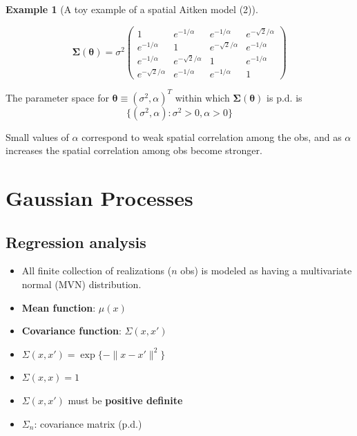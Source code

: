 \documentclass[
  letterpaper,
  DIV=11,
  numbers=noendperiod]{scrreprt}
\theoremstyle{definition}
\theoremstyle{plain}
\theoremstyle{definition}
\newtheorem{example}{Example}[chapter]
\theoremstyle{definition}
\theoremstyle{remark}
\begin{document}
\begin{example}[A toy example of a spatial Aitken model
(2)]\protect\hypertarget{exm-Aitken2}{}\label{exm-Aitken2}

\[
\pmb{\Sigma}(\pmb{\theta}) = \sigma^2
\begin{pmatrix}
1 & e^{-1/\alpha} & e^{-1/\alpha} & e^{-\sqrt{2}/\alpha}\\
e^{-1/\alpha} & 1 & e^{-\sqrt{2}/\alpha} & e^{-1/\alpha}\\
e^{-1/\alpha} & e^{-\sqrt{2}/\alpha} & 1 & e^{-1/\alpha}\\
e^{-\sqrt{2}/\alpha} & e^{-1/\alpha} & e^{-1/\alpha} & 1
\end{pmatrix}
\]

The parameter space for \(\pmb{\theta} \equiv (\sigma^2, \alpha)^T\)
within which \(\pmb{\Sigma}(\pmb{\theta})\) is p.d. is \[
\{ (\sigma^2, \alpha) : \sigma^2 > 0 , \alpha >0 \}
\]

Small values of \(\alpha\) correspond to weak spatial correlation among
the obs, and as \(\alpha\) increases the spatial correlation among obs
become stronger.

\end{example}

\chapter{Gaussian Processes}\label{gaussian-processes}

\section{Regression analysis}\label{regression-analysis-1}

\begin{itemize}
\item
  All finite collection of realizations (\(n\) obs) is modeled as having
  a multivariate normal (MVN) distribution.
\item
  \textbf{Mean function}: \(\mu (x)\)
\item
  \textbf{Covariance function}: \(\Sigma (x, x')\)
\item
  \(\Sigma (x, x') = \exp \{ - \| x- x' \|^2 \}\)
\item
  \(\Sigma (x, x )=1\)
\item
  \(\Sigma (x, x')\) must be \textbf{positive definite}
\item
  \(\Sigma_n\): covariance matrix (p.d.)
\end{itemize}
\end{document}

